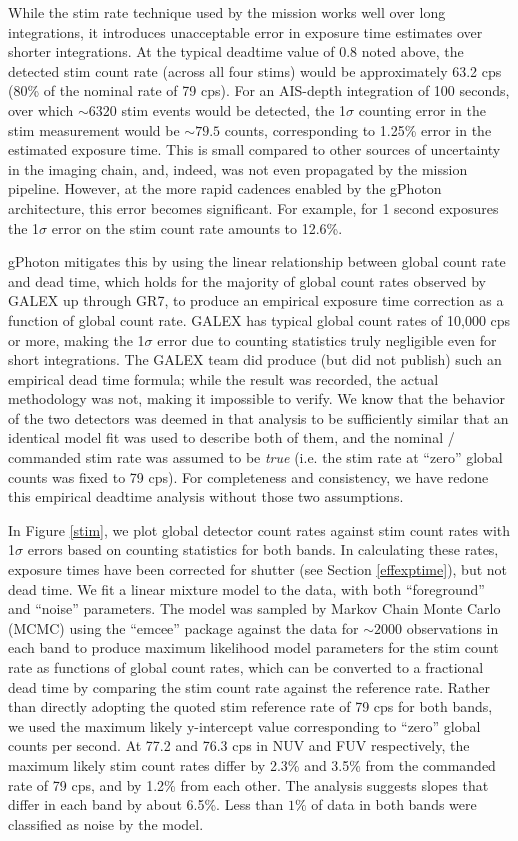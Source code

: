 \documentclass[iop]{emulateapj}
\begin{document}
While the stim rate technique used by the mission works well over long integrations, it introduces unacceptable error in exposure time estimates over shorter integrations. At the typical deadtime value of 0.8 noted above, the detected stim count rate (across all four stims) would be approximately 63.2 cps (80\% of the nominal rate of 79 cps). For an AIS-depth integration of 100 seconds, over which $\sim 6320$ stim events would be detected, the 1$\sigma$ counting error in the stim measurement would be $\sim 79.5$ counts, corresponding to 1.25\% error in the estimated exposure time. This is small compared to other sources of uncertainty in the imaging chain, and, indeed, was not even propagated by the mission pipeline. However, at the more rapid cadences enabled by the gPhoton architecture, this error becomes significant. For example, for 1 second exposures the 1$\sigma$ error on the stim count rate amounts to 12.6\%.

gPhoton mitigates this by using the linear relationship between global count rate and dead time, which holds for the majority of global count rates observed by GALEX up through GR7, to produce an empirical exposure time correction as a function of global count rate. GALEX has typical global count rates of 10,000 cps or more, making the 1$\sigma$ error due to counting statistics truly negligible even for short integrations. The GALEX team did produce (but did not publish) such an empirical dead time formula; while the result was recorded, the actual methodology was not, making it impossible to verify. We know that the behavior of the two detectors was deemed in that analysis to be sufficiently similar that an identical model fit was used to describe both of them, and the nominal / commanded stim rate was assumed to be \emph{true} (i.e. the stim rate at ``zero'' global counts was fixed to 79 cps). For completeness and consistency, we have redone this empirical deadtime analysis without those two assumptions.

In Figure \ref{stim}, we plot global detector count rates against stim count rates with 1$\sigma$ errors based on counting statistics for both bands. In calculating these rates, exposure times have been corrected for shutter (see Section \ref{effexptime}), but not dead time. We fit a linear mixture model to the data, with both ``foreground'' and ``noise'' parameters. The model was sampled by Markov Chain Monte Carlo (MCMC) using the ``emcee'' package \citep{for2013} against the data for $\sim 2000$ observations in each band to produce maximum likelihood model parameters for the stim count rate as functions of global count rates, which can be converted to a fractional dead time by comparing the stim count rate against the reference rate. Rather than directly adopting the quoted stim reference rate of 79 cps for both bands, we used the maximum likely y-intercept value corresponding to ``zero'' global counts per second. At 77.2 and 76.3 cps in NUV and FUV respectively, the maximum likely stim count rates differ by 2.3\% and 3.5\% from the commanded rate of 79 cps, and by 1.2\% from each other. The analysis suggests slopes that differ in each band by about 6.5\%. Less than $1\%$ of data in both bands were classified as noise by the model.
\end{document}
